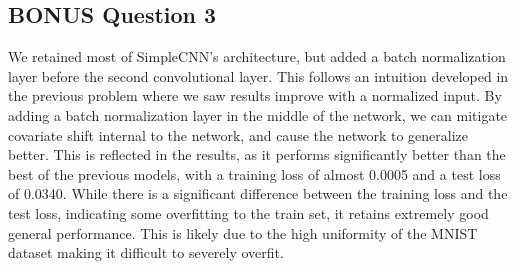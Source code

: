 \documentclass{article}
\begin{document}
\subsection{BONUS Question 3}
We retained most of SimpleCNN's architecture, but added a batch normalization layer before the second convolutional layer. This follows an intuition developed in the previous problem where we saw results improve with a normalized input. By adding a batch normalization layer in the middle of the network, we can mitigate covariate shift internal to the network, and cause the network to generalize better. This is reflected in the results, as it performs significantly better than the best of the previous models, with a training loss of almost 0.0005 and a test loss of 0.0340. While there is a significant difference between the training loss and the test loss, indicating some overfitting to the train set, it retains extremely good general performance. This is likely due to the high uniformity of the MNIST dataset making it difficult to severely overfit. 
\end{document}
